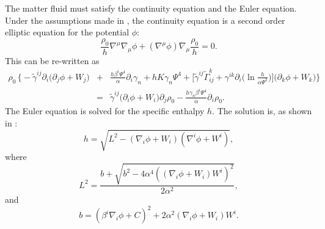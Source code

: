The matter fluid must satisfy the continuity equation and the Euler
equation. 
Under the assumptions made in \cite{Tichy:2011gw}, the continuity equation is a second order elliptic equation for the potential $\phi$:
\begin{equation}
\label{eq:Continuity1}
\frac{\rho_0}{h}\nabla^{\mu}\nabla_{\mu}\phi+\left(\nabla^{\mu}\phi\right)\nabla_{\mu}\frac{\rho_0}{h}=0.
\end{equation}
This can be re-written as
\begin{eqnarray}
\label{eq:Continuity2}
\rho_0\,\bigg\{\!\!-\tilde{\gamma}^{ij}\partial_i\big(\partial_j\phi+W_j\big)  &+& \frac{h\beta^i\Psi^4}{\alpha}\partial_i\gamma_n + hK\gamma_n\Psi^4+\Big[\tilde{\gamma}^{ij}\tilde{\Gamma}^k_{ij}+\gamma^{ik}\partial_i\big(\ln \frac{h}{\alpha\Psi^2}\big)\Big] 
\big(\partial_k\phi+W_k\big) \bigg\} \nonumber\\
&=&\tilde{\gamma}^{ij}\big(\partial_i\phi+W_i\big)\partial_j\rho_0 - \frac{h\gamma_n\beta^i\Psi^4}{\alpha}\partial_i\rho_0.
\label{eq:Continuity}
\end{eqnarray}
The Euler equation is solved for the specific enthalpy $h$. The
solution is, as shown in \cite{Tichy:2011gw}:
\begin{equation}
h = \sqrt{L^2 -
  \left(\nabla_i\phi+W_i\right)\left(\nabla^i\phi+W^i\right)},
\end{equation}
where
\begin{equation}
L^2 =
\frac{b+\sqrt{b^2-4\alpha^4\left(\left(\nabla_i\phi+W_i\right)W^i\right)^2}}{2\alpha^2},
\end{equation}
and
\begin{equation}
b =
\left(\beta^i\nabla_i\phi+C\right)^2+2\alpha^2\left(\nabla_i\phi+W_i\right)W^i.
\end{equation}

